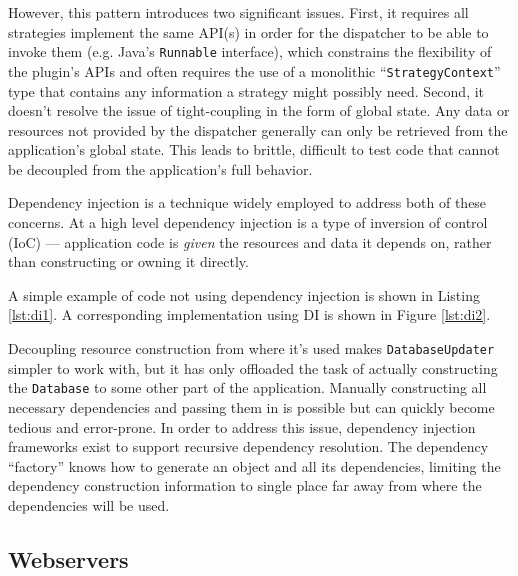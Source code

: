\documentclass[sigconf]{acmart}
\def\code#1{\lstinline{#1}}
\begin{document}
However, this pattern introduces two significant issues. First, it requires all strategies implement the same API(s) in order for the dispatcher to be able to invoke them (e.g. Java's \code{Runnable} interface), which constrains the flexibility of the plugin's APIs and often requires the use of a monolithic ``\code{StrategyContext}'' type that contains any information a strategy might possibly need. Second, it doesn't resolve the issue of tight-coupling in the form of global state. Any data or resources not provided by the dispatcher generally can only be retrieved from the application's global state. This leads to brittle, difficult to test code that cannot be decoupled from the application's full behavior.

Dependency injection is a technique widely employed to address both of these concerns. At a high level dependency injection is a type of inversion of control (IoC) --- application code is \textit{given} the resources and data it depends on, rather than constructing or owning it directly.

A simple example of code not using dependency injection is shown in Listing \ref{lst:di1}. A corresponding implementation using DI is shown in Figure \ref{lst:di2}.

\begin{minipage}{\linewidth}

\end{minipage}

\begin{minipage}{\linewidth}

\end{minipage}

Decoupling resource construction from where it's used makes \code{DatabaseUpdater} simpler to work with, but it has only offloaded the task of actually constructing the \code{Database} to some other part of the application. Manually constructing all necessary dependencies and passing them in is possible but can quickly become tedious and error-prone. In order to address this issue, dependency injection frameworks exist to support recursive dependency resolution. The dependency ``factory'' knows how to generate an object and all its dependencies, limiting the dependency construction information to single place far away from where the dependencies will be used. 

\subsection{Webservers}
\end{document}
